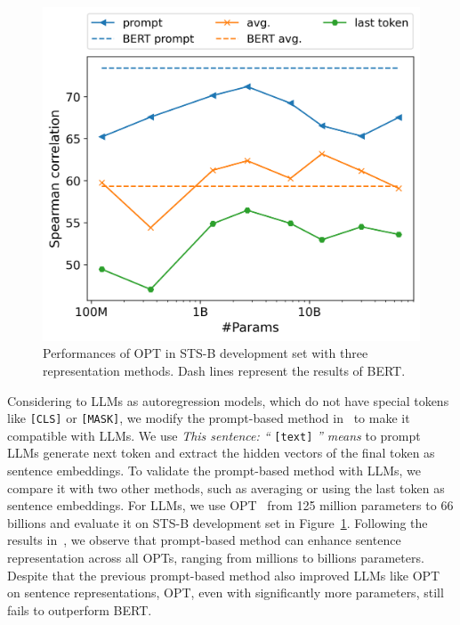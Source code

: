 \documentclass{article}
\newcommand{\hytt}[1]{\texttt{\hyphenchar \font=\defaulthyphenchar#1}}
\begin{document}
\begin{figure}%
\centering
\vspace{-10pt}
	\includegraphics[width=0.44\columnwidth]{LLM_represent.png}
\caption{
  Performances of OPT in STS-B development set with three representation methods.
  Dash lines represent the results of BERT. %
}
\label{fig:LLM_rep}
\end{figure}

Considering to LLMs as autoregression models, which do not have special tokens like \texttt{[CLS]} or \texttt{[MASK]}, we modify the prompt-based method in~\cite{jiang2022promptbert} to make it compatible with LLMs.
We use \textit{This sentence: ``} \texttt{[text]} \textit{'' means} to prompt LLMs generate next token and extract the hidden vectors of the final token as sentence embeddings.
To validate the prompt-based method with LLMs, we compare it with two other methods, such as averaging or using the last token as sentence embeddings.
For LLMs, we use OPT~\cite{zhang2022opt} from 125 million parameters to 66 billions and evaluate it on STS-B development set in Figure~\ref{fig:LLM_rep}.
Following the results in~\cite{jiang2022promptbert}, we observe that prompt-based method can enhance sentence representation across all OPTs, ranging from millions to billions parameters.
Despite that the previous prompt-based method also improved LLMs like OPT on sentence representations, OPT, even with significantly more parameters, still fails to outperform BERT.

\end{document}
